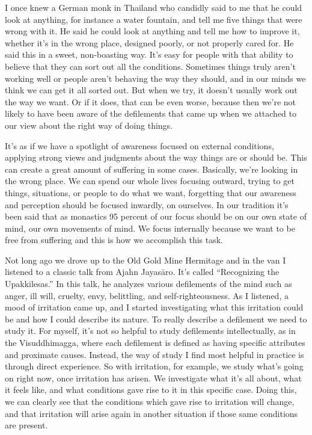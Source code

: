 I once knew a German monk in Thailand who candidly said to me that he 
could look at anything, for instance a water fountain, and tell me five 
things that were wrong with it. He said he could look at anything and 
tell me how to improve it, whether it's in the wrong place, designed 
poorly, or not properly cared for. He said this in a sweet, 
non-boasting way. It's easy for people with that ability to believe 
that they can sort out all the conditions. Sometimes things truly 
aren't working well or people aren't behaving the way they should, and 
in our minds we think we can get it all sorted out. But when we try, it 
doesn't usually work out the way we want. Or if it does, that can be 
even worse, because then we're not likely to have been aware of the 
defilements that came up when we attached to our view about the right 
way of doing things.

It's as if we have a spotlight of awareness focused on external 
conditions, applying strong views and judgments about the way things 
are or should be. This can create a great amount of suffering in some 
cases. Basically, we're looking in the wrong place. We can spend our 
whole lives focusing outward, trying to get things, situations, or 
people to do what we want, forgetting that our awareness and perception 
should be focused inwardly, on ourselves. In our tradition it's been 
said that as monastics 95 percent of our focus should be on our own 
state of mind, our own movements of mind. We focus internally because 
we want to be free from suffering and this is how we accomplish this 
task.

Not long ago we drove up to the Old Gold Mine Hermitage and in the van 
I listened to a classic talk from Ajahn Jayasāro. It's called 
``Recognizing the Upakkilesas.'' In this talk, he analyzes various 
defilements of the mind such as anger, ill will, cruelty, envy, 
belittling, and self-righteousness. As I listened, a mood of irritation 
came up, and I started investigating what this irritation could be and 
how I could describe its nature. To really describe a defilement we 
need to study it. For myself, it's not so helpful to study defilements 
intellectually, as in the Visuddhimagga, where each defilement is 
defined as having specific attributes and proximate causes. Instead, 
the way of study I find most helpful in practice is through direct 
experience. So with irritation, for example, we study what's going on 
right now, once irritation has arisen. We investigate what it's all 
about, what it feels like, and what conditions gave rise to it in this 
specific case. Doing this, we can clearly see that the conditions which 
gave rise to irritation will change, and that irritation will arise 
again in another situation if those same conditions are present.

